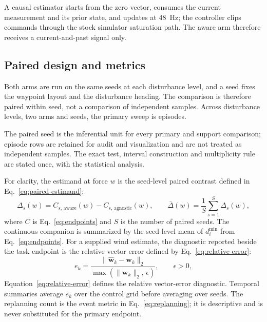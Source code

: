 A causal estimator starts from the zero vector, consumes the current measurement
and its prior state, and updates at 48~Hz; the controller clips commands through
the stock simulator saturation path. The aware arm therefore receives a
current-and-past signal only.

\subsection{Paired design and metrics}

Both arms are run on the same \NSeeds{} seeds at each disturbance level, and a seed
fixes the waypoint layout and the disturbance heading. The comparison is therefore
paired within seed, not a comparison of independent samples. Across
\NWindLevels{} disturbance levels, two arms and \NSeeds{} seeds, the primary sweep is
\NEpisodesOracle{} episodes.

The paired seed is the inferential unit for every primary and support comparison;
episode rows are retained for audit and visualization and are not treated as
independent samples. The exact test, interval construction and multiplicity rule
are stated once, with the statistical analysis.

For clarity, the estimand at force $w$ is the seed-level paired contrast defined
in Eq.~\eqref{eq:paired-estimand}:
\begin{equation}
  \Delta_s(w)=C_{s,\,\mathrm{aware}}(w)-C_{s,\,\mathrm{agnostic}}(w),
  \qquad
  \bar\Delta(w)=\frac{1}{S}\sum_{s=1}^{S}\Delta_s(w),
  \label{eq:paired-estimand}
\end{equation}
where $C$ is Eq.~\eqref{eq:endpoints} and $S$ is the number of paired seeds.
The continuous companion is summarized by the seed-level mean of $d_i^{\min}$
from Eq.~\eqref{eq:endpoints}. For a supplied wind estimate, the diagnostic
reported beside the task endpoint is the relative vector error defined by
Eq.~\eqref{eq:relative-error}:
\begin{equation}
  e_k=\frac{\lVert\widehat{\mathbf w}_k-\mathbf w_k\rVert_2}
  {\max(\lVert\mathbf w_k\rVert_2,\,\epsilon)},
  \qquad \epsilon>0,
  \label{eq:relative-error}
\end{equation}
Equation~\eqref{eq:relative-error} defines the relative vector-error diagnostic.
Temporal summaries average $e_k$ over the control grid before averaging over
seeds. The replanning count is the event metric in Eq.~\eqref{eq:replanning}; it
is descriptive and is never substituted for the primary endpoint.


